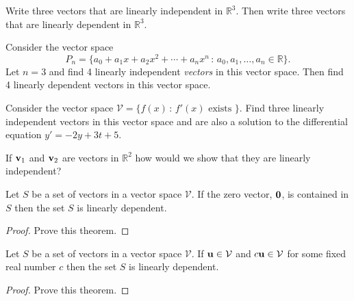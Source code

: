 \begin{problem}
    Write three vectors that are linearly independent in $\mathbb{R}^3$.  Then write
    three vectors that are linearly dependent in $\mathbb{R}^3$. 
\end{problem}

\begin{problem}
    Consider the vector space 
    \[ P_n = \{ a_0 + a_1 x + a_2 x^2 + \cdots + a_n x^n \,
    : \, a_0, a_1, \dots, a_n \in \mathbb{R} \}. \]
    Let $n=3$ and find 4 linearly
        independent {\it vectors} in this vector space.  Then find 4 linearly dependent
        vectors in this vector space.
\end{problem}

\begin{problem}
    Consider the vector space $\mathcal{V} = \{ f(x) \, : \, f'(x) \text{ exists } \}$.
    Find three linearly independent vectors in this vector space and are also a solution
    to the differential equation $y' = -2y + 3t + 5$.
\end{problem}
\solution{
    \[ \{ e^{2t}, t, 1 \} \]
}

\begin{problem}
    If ${\bf v}_1$ and ${\bf v}_2$ are vectors in $\mathbb{R}^2$ how would we show that they are
    linearly independent?
\end{problem}

\begin{thm}
    Let $S$ be a set of vectors in a vector space $\mathcal{V}$.  If the zero vector,
    ${\bf 0}$, is contained in $S$ then the set $S$ is linearly dependent.
\end{thm}
\begin{proof}
    Prove this theorem.
\end{proof}


\begin{thm}
    Let $S$ be a set of vectors in a vector space $\mathcal{V}$.  If ${\bf u} \in \mathcal{V}$
    and $c{\bf u} \in \mathcal{V}$ for some fixed real number $c$ then the set $S$ is linearly
    dependent.
\end{thm}
\begin{proof}
    Prove this theorem.
\end{proof}

